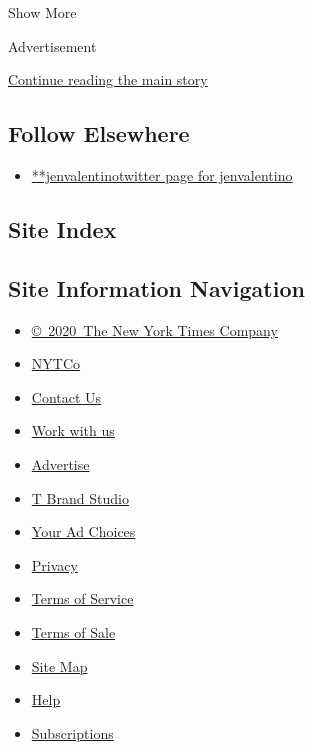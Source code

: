 Show More

Advertisement

\protect\hyperlink{after-mid2}{Continue reading the main story}

\hypertarget{follow-elsewhere}{%
\subsection{Follow Elsewhere}\label{follow-elsewhere}}

\begin{itemize}
\tightlist
\item
  \href{https://twitter.com/jenvalentino}{**jenvalentinotwitter page for
  jenvalentino}
\end{itemize}

\hypertarget{site-index}{%
\subsection{Site Index}\label{site-index}}

\hypertarget{site-information-navigation}{%
\subsection{Site Information
Navigation}\label{site-information-navigation}}

\begin{itemize}
\tightlist
\item
  \href{https://help.nytimes.com/hc/en-us/articles/115014792127-Copyright-notice}{©~2020~The
  New York Times Company}
\end{itemize}

\begin{itemize}
\tightlist
\item
  \href{https://www.nytco.com/}{NYTCo}
\item
  \href{https://help.nytimes.com/hc/en-us/articles/115015385887-Contact-Us}{Contact
  Us}
\item
  \href{https://www.nytco.com/careers/}{Work with us}
\item
  \href{https://nytmediakit.com/}{Advertise}
\item
  \href{http://www.tbrandstudio.com/}{T Brand Studio}
\item
  \href{https://www.nytimes.com/privacy/cookie-policy\#how-do-i-manage-trackers}{Your
  Ad Choices}
\item
  \href{https://www.nytimes.com/privacy}{Privacy}
\item
  \href{https://help.nytimes.com/hc/en-us/articles/115014893428-Terms-of-service}{Terms
  of Service}
\item
  \href{https://help.nytimes.com/hc/en-us/articles/115014893968-Terms-of-sale}{Terms
  of Sale}
\item
  \href{https://spiderbites.nytimes.com}{Site Map}
\item
  \href{https://help.nytimes.com/hc/en-us}{Help}
\item
  \href{https://www.nytimes.com/subscription?campaignId=37WXW}{Subscriptions}
\end{itemize}
